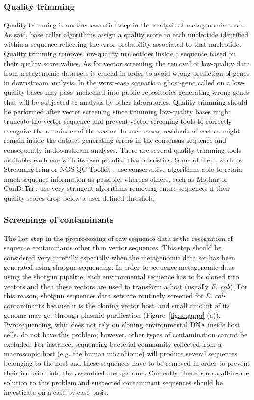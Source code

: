 \subsubsection*{Quality trimming}
Quality trimming is another essential step in the analysis of metagenomic reads. As said, base caller algorithms assign a quality score to each nucleotide identified within a sequence reflecting the error probability associated to that nucleotide. Quality trimming removes low-quality nucleotides inside a sequence based on their quality score values. As for vector screening, the removal of low-quality data from metagenomic data sets is crucial in order to avoid wrong prediction of genes in downstream analysis. In the worst-case scenario a ghost-gene called on a low-quality bases may pass unchecked into public repositories generating wrong genes that will be subjected to analysis by other laboratories. Quality trimming should be performed after vector screening since trimming low-quality bases might truncate the vector sequence and prevent vector-screening tools to correctly recognize the remainder of the vector. In such cases, residuals of vectors might remain inside the dataset generating errors in the consensus sequence and consequently in downstream analyses. There are several quality trimming tools available, each one with its own peculiar characteristics. Some of them, such as StreamingTrim \cite{bacci2014streamingtrim} or NGS QC Toolkit \cite{patel2012ngs}, use conservative algorithms able to retain much sequence information as possible; whereas others, such as Mothur \cite{schloss2009introducing} or ConDeTri \cite{smeds2011condetri}, use very stringent algorithms removing entire sequences if their quality scores drop below a user-defined threshold.

\subsubsection*{Screenings of contaminants}
The last step in the preprocessing of raw sequence data is the recognition of sequence contaminants other than vector sequences. This step should be considered very carefully especially when the metagenomic data set has been  generated using shotgun sequencing. In order to sequence metagenomic data using the shotgun pipeline, each environmental sequence has to be cloned into vectors and then these vectors are used to transform a host (usually \textit{E. coli}). For this reason, shotgun sequences data sets are routinely screened for \textit{E. coli} contaminants because it is the cloning vector host, and small amount of its genome may get through plasmid purification (Figure~\ref{fig:seqappr} (a)). Pyrosequencing, whic does not rely on cloning environmental DNA inside host cells, do not have this problem; however, other types of contamination cannot be excluded. For instance, sequencing bacterial community collected from a macroscopic host (e.g. the human microbiome) will produce several sequences belonging to the host and these sequences have to be removed in order to prevent their inclusion into the assembled metagenome. Currently, there is no a all-in-one solution to this problem and suspected contaminant sequences should be investigate on a case-by-case basis.

